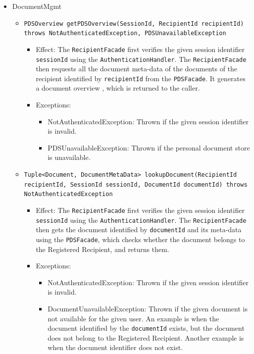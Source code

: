 \documentclass[a4paper,10pt]{article}
\begin{document}
\begin{itemize}
    \item DocumentMgmt
    \begin{itemize}
        \item \texttt{PDSOverview getPDSOverview(SessionId, RecipientId recipientId)\\ throws NotAuthenticatedException, PDSUnavailableException}
        \begin{itemize}
            \item Effect: The \texttt{RecipientFacade} first verifies the given session identifier \texttt{sessionId} using the \texttt{AuthenticationHandler}. The \texttt{RecipientFacade} then requests all the document meta-data of the documents of the recipient identified by \texttt{recipientId} from the \texttt{PDSFacade}. It generates a document overview , which is returned  to the caller.
            \item Exceptions:
             \begin{itemize}
                \item NotAuthenticatedException: Thrown if the given session identifier is invalid.
                \item PDSUnavailableException: Thrown if the personal document store is unavailable.
            \end{itemize}       	
        \end{itemize}
      
      \item \texttt{Tuple<Document, DocumentMetaData> lookupDocument(RecipientId recipientId, SessionId sessionId, DocumentId documentId) throws NotAuthenticatedException}  
        \begin{itemize}
            \item Effect: The \texttt{RecipientFacade} first verifies the given session identifier \texttt{sessionId} using the \texttt{AuthenticationHandler}. The \texttt{RecipientFacade} then gets the document identified by \texttt{documentId} and its meta-data using the \texttt{PDSFacade}, which checks whether the document belongs to the Registered Recipient, and returns them.
            \item Exceptions:
             \begin{itemize}
                \item NotAuthenticatedException: Thrown if the given session identifier is invalid.
                \item DocumentUnavailableException: Thrown if the given document is not available for the given user. An example is when the document identified by the \texttt{documentId} exists, but the document does not belong to the Registered Recipient. Another example is when the document identifier does not exist.
            \end{itemize}       	
        \end{itemize}
                
    \end{itemize}
\end{itemize}
\end{document}
